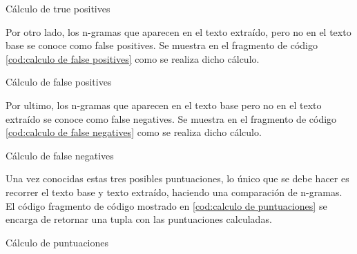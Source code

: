 \begin{codefloat}
  
  \caption{Cálculo de true positives}
  \label{cod:calculo de true positives}
\end{codefloat}

Por otro lado, los n-gramas que aparecen en el texto extraído, pero no en el texto base se conoce como 
false positives. Se muestra en el fragmento de código \ref{cod:calculo de false positives} como se realiza 
dicho cálculo.

\begin{codefloat}
  
  \caption{Cálculo de false positives}
  \label{cod:calculo de false positives}
\end{codefloat}

Por ultimo, los n-gramas que aparecen en el texto base pero no en el texto extraído se conoce como false 
negatives. Se muestra en el fragmento de código \ref{cod:calculo de false negatives} como se realiza dicho 
cálculo.

\begin{codefloat}
  
  \caption{Cálculo de false negatives}
  \label{cod:calculo de false negatives}
\end{codefloat}

Una vez conocidas estas tres posibles puntuaciones, lo único que se debe hacer es recorrer el texto base
y texto extraído, haciendo una comparación de n-gramas. El código fragmento de código mostrado en
\ref{cod:calculo de puntuaciones} se encarga de retornar una tupla con las puntuaciones calculadas.

\begin{codefloat}
  
  \caption{Cálculo de puntuaciones}
  \label{cod:calculo de puntuaciones}
\end{codefloat}


































